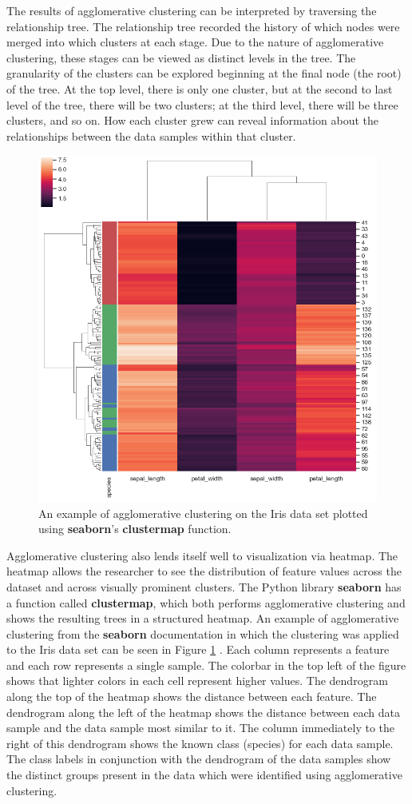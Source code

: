 The results of agglomerative clustering can be interpreted by traversing the relationship tree. The relationship tree recorded the history of which nodes were merged into which clusters at each stage. Due to the nature of agglomerative clustering, these stages can be viewed as distinct levels in the tree. The granularity of the clusters can be explored beginning at the final node (the root) of the tree. At the top level, there is only one cluster, but at the second to last level of the tree, there will be two clusters; at the third level, there will be three clusters, and so on. How each cluster grew can reveal information about the relationships between the data samples within that cluster.

\begin{figure}
\centering
\includegraphics[width=.55\textwidth]{4/clustermap-example.png}
\caption{An example of agglomerative clustering on the Iris data set plotted using \textbf{seaborn}'s \textbf{clustermap} function.}
\label{ch4:fig:agg}
\vspace{-30pt}
\end{figure}

Agglomerative clustering also lends itself well to visualization via heatmap. The heatmap allows the researcher to see the distribution of feature values across the dataset and across visually prominent clusters. The Python library \textbf{seaborn} has a function called \textbf{clustermap}, which both performs agglomerative clustering and shows the resulting trees in a structured heatmap. An example of agglomerative clustering from the \textbf{seaborn} documentation in which the clustering was applied to the Iris data set can be seen in  Figure \ref{ch4:fig:agg} \cite{Waskom2018}. Each column represents a feature and each row represents a single sample. The colorbar in the top left of the figure shows that lighter colors in each cell represent higher values. The dendrogram along the top of the heatmap shows the distance between each feature. The dendrogram along the left of the heatmap shows the distance between each data sample and the data sample most similar to it. The column immediately to the right of this dendrogram shows the known class (species) for each data sample. The class labels in conjunction with the dendrogram of the data samples show the distinct groups present in the data which were identified using agglomerative clustering. 

